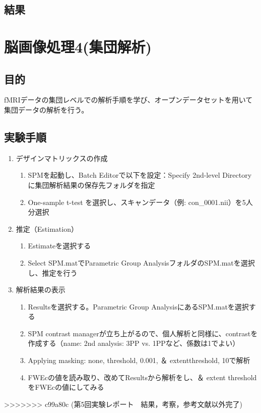 \documentclass{jlreq}
\begin{document}
\subsection{結果}

\section{脳画像処理4(集団解析)}
\subsection{目的}
fMRIデータの集団レベルでの解析手順を学び、オープンデータセットを用いて集団データの解析を行う。

\subsection{実験手順}
\begin{enumerate}
    \item デザインマトリックスの作成
        \begin{enumerate}
            \item SPMを起動し、Batch Editorで以下を設定：Specify 2nd-level Directory に集団解析結果の保存先フォルダを指定
            \item One-sample t-test を選択し、スキャンデータ（例: con\_0001.nii）を5人分選択
        \end{enumerate}
    \item 推定（Estimation）
        \begin{enumerate}
            \item Estimateを選択する
            \item Select SPM.matでParametric Group AnalysisフォルダのSPM.matを選択し、推定を行う
        \end{enumerate}
    \item 解析結果の表示
        \begin{enumerate}
            \item Resultsを選択する。Parametric Group AnalysisにあるSPM.matを選択する
            \item SPM contrast managerが立ち上がるので、個人解析と同様に、contrastを作成する（name: 2nd
                analysis: 3PP vs. 1PPなど、係数は1でよい）
            \item Applying masking: none, threshold, 0.001, ＆ extentthreshold, 10で解析
            \item FWEcの値を読み取り、改めてResultsから解析をし、＆ extent thresholdをFWEcの値にしてみる
        \end{enumerate}
\end{enumerate}
>>>>>>> c99a80c (第5回実験レポート　結果，考察，参考文献以外完了)
\end{document}
